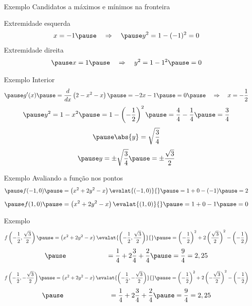 \begin{frame}{Exemplo \theexemplo}
  Candidatos a máximos e mínimos na fronteira

  \pause
  \vspace{\baselineskip}
  Extremidade esquerda
  \[
    x = -1
    \pause
    \quad\Rightarrow\quad
    \pause
    y^2 = 1 - (-1)^2 = 0
  \]
  \pause
  Extremidade direita
  \[
    \pause
    x = 1
    \pause
    \quad\Rightarrow\quad
    y^2 = 1 - 1^2
    \pause
    = 0
  \]
\end{frame}

\begin{frame}{Exemplo \theexemplo}
  Interior
  \[
    \pause
    g'(x)
    \pause
    = \frac{d}{dx}\left(2 - x^2 - x\right)
    \pause
    = -2x - 1
    \pause
    = 0
    \pause
    \quad\Rightarrow\quad
    x = -\frac{1}{2}
  \]
  \[
    \pause
    y^2 = 1 - x^2
    \pause
    = 1 - \left(-\frac{1}{2}\right)^2
    \pause
    = \frac{4}{4} - \frac{1}{4}
    \pause
    = \frac{3}{4}
 \]
 \[
    \pause
    \abs{y} = \sqrt{\frac{3}{4}}
  \]
  \[
    \pause
    y
    = \pm\sqrt{\frac{3}{4}}
    \pause
    = \pm\frac{\sqrt{3}}{2}
  \]
\end{frame}

\begin{frame}{Exemplo \theexemplo}
  Avaliando a função nos pontos
  \[
    \pause
    f(-1, 0)
    \pause
    = \left(x^2 + 2y^2 - x\right)\evalat{(-1, 0)}{}
    \pause
    = 1 + 0 - (-1)
    \pause
    = 2
  \]
  \[
    \pause
    f(1, 0)
    \pause
    = \left(x^2 + 2y^2 - x\right)\evalat{(1, 0)}{}
    \pause
    = 1 + 0 - 1
    \pause
    = 0
  \]
\end{frame}

\begin{frame}{Exemplo \theexemplo}
  \[
    f\left(-\frac{1}{2}, \frac{\sqrt{3}}{2}\right)
    \pause
    = \left(x^2 + 2y^2 - x\right)\evalat{\left(-\frac{1}{2}, \frac{\sqrt{3}}{2}\right)}{}
    \pause
    = \left(-\frac{1}{2}\right)^2 + 2\left(\frac{\sqrt{3}}{2}\right)^2 - \left(-\frac{1}{2}\right)
  \]
  \[
    \pause
    \hphantom{f\left(-\frac{1}{2}, \frac{\sqrt{3}}{2}\right)}\,
    = \frac{1}{4} + 2\frac{3}{4} + \frac{2}{4}
    \pause
    = \frac{9}{4}
    = 2,25
  \]

  \pause
  \[
    f\left(-\frac{1}{2}, -\frac{\sqrt{3}}{2}\right)
    \pause
    = \left(x^2 + 2y^2 - x\right)\evalat{\left(-\frac{1}{2}, -\frac{\sqrt{3}}{2}\right)}{}
    \pause
    = \left(-\frac{1}{2}\right)^2 + 2\left(-\frac{\sqrt{3}}{2}\right)^2 - \left(-\frac{1}{2}\right)
  \]
  \[
    \pause
    \hphantom{f\left(-\frac{1}{2}, -\frac{\sqrt{3}}{2}\right)}\,
    = \frac{1}{4} + 2\frac{3}{4} + \frac{2}{4}
    \pause
    = \frac{9}{4}
    = 2,25
  \]
\end{frame}

